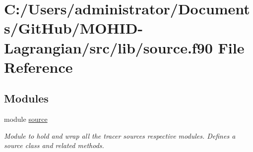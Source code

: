 \hypertarget{source_8f90}{}\section{C\+:/\+Users/administrator/\+Documents/\+Git\+Hub/\+M\+O\+H\+I\+D-\/\+Lagrangian/src/lib/source.f90 File Reference}
\label{source_8f90}
\subsection*{Modules}
\begin{DoxyCompactItemize}
\item 
module \mbox{\hyperlink{namespacesource}{source}}
\begin{DoxyCompactList}\small\item\em Module to hold and wrap all the tracer sources respective modules. Defines a source class and related methods. \end{DoxyCompactList}\end{DoxyCompactItemize}
